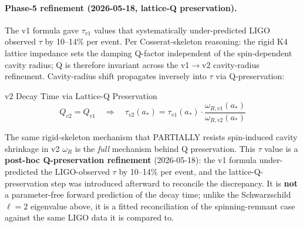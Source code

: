 \paragraph{Phase-5 refinement (2026-05-18, lattice-Q preservation).} The v1 formula gave $\tau_{v1}$ values that systematically under-predicted LIGO observed $\tau$ by 10--14\% per event. Per Cosserat-skeleton reasoning: the rigid K4 lattice impedance sets the damping Q-factor independent of the spin-dependent cavity radius; Q is therefore invariant across the v1$\to$v2 cavity-radius refinement. Cavity-radius shift propagates inversely into $\tau$ via Q-preservation:
\begin{resultbox}{v2 Decay Time via Lattice-Q Preservation}
\begin{equation}
    Q_{v2} = Q_{v1} \quad\Longrightarrow\quad \tau_{v2}(a_*) = \tau_{v1}(a_*) \cdot \frac{\omega_{R,v1}(a_*)}{\omega_{R,v2}(a_*)}
\end{equation}
\end{resultbox}
\noindent The same rigid-skeleton mechanism that PARTIALLY resists spin-induced cavity shrinkage in v2 $\omega_R$ is the \emph{full} mechanism behind Q preservation. This $\tau$ value is a \textbf{post-hoc Q-preservation refinement} (2026-05-18): the v1 formula under-predicted the LIGO-observed $\tau$ by 10--14\% per event, and the lattice-Q-preservation step was introduced afterward to reconcile the discrepancy. It is \textbf{not} a parameter-free forward prediction of the decay time; unlike the Schwarzschild $\ell=2$ eigenvalue above, it is a fitted reconciliation of the spinning-remnant case against the same LIGO data it is compared to.

